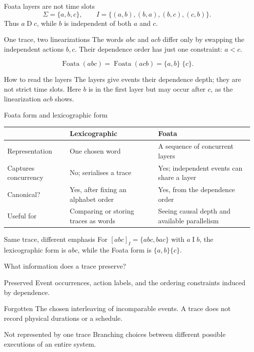 \documentclass[t,11pt]{beamer}
\newcommand{\ind}{\mathrel{I}}
\newcommand{\dep}{\mathrel{D}}
\begin{document}
\begin{frame}{Foata layers are not time slots}
  \[
    \Sigma=\{a,b,c\},\qquad I=\{(a,b),(b,a),(b,c),(c,b)\}.
  \]
  Thus $a\dep c$, while $b$ is independent of both $a$ and $c$.
  \begin{block}{One trace, two linearizations}
    The words $abc$ and $acb$ differ only by swapping the independent actions $b,c$.
    Their dependence order has just one constraint: $a<c$.
  \end{block}
  \begin{center}
    \[
      \operatorname{Foata}(abc)=\operatorname{Foata}(acb)
      =\{a,b\}\;\{c\}.
    \]
  \end{center}
  \begin{block}{How to read the layers}
    The layers give events their dependence depth; they are not strict time slots.
    Here $b$ is in the first layer but may occur after $c$, as the linearization $acb$ shows.
  \end{block}
\end{frame}


\begin{frame}{Foata form and lexicographic form}
  \begin{center}
  \begin{tabular}{>{\raggedright\arraybackslash}p{}|>{\raggedright\arraybackslash}p{}|>{\raggedright\arraybackslash}p{}}
    & \textbf{Lexicographic} & \textbf{Foata}\\ \hline
    Representation & One chosen word & A sequence of concurrent layers\\
    Captures concurrency & No; serialises a trace & Yes; independent events can share a layer\\
    Canonical? & Yes, after fixing an alphabet order & Yes, from the dependence order\\
    Useful for & Comparing or storing traces as words & Seeing causal depth and available parallelism
  \end{tabular}
  \end{center}
  \begin{block}{Same trace, different emphasis}
    For $[abc]_I=\{abc,bac\}$ with $a\ind b$, the lexicographic form is $abc$, while the Foata form is $\{a,b\}\{c\}$.
  \end{block}
\end{frame}


\begin{frame}{What information does a trace preserve?}
  \begin{block}{Preserved}
    Event occurrences, action labels, and the ordering constraints induced by dependence.
  \end{block}
  \begin{block}{Forgotten}
    The chosen interleaving of incomparable events. A trace does not record physical durations or a schedule.
  \end{block}
  \begin{block}{Not represented by one trace}
    Branching choices between different possible executions of an entire system.
  \end{block}
\end{frame}
\end{document}
